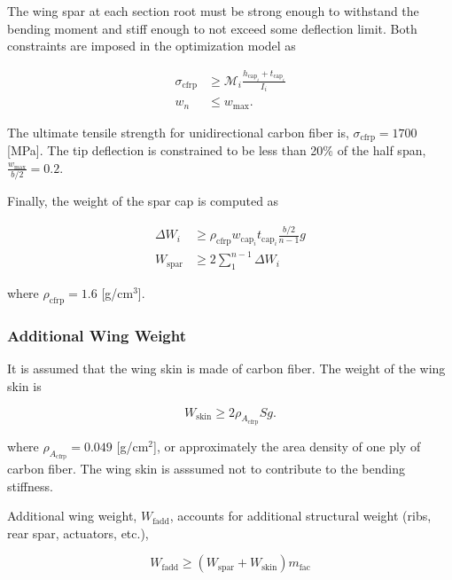 The wing spar at each section root must be strong enough to withstand the bending moment and stiff enough to not exceed some deflection limit.  Both constraints are imposed in the optimization model as

\begin{align}
    \label{e:stresscont}
    \sigma_{\text{cfrp}} &\geq \mathcal{M}_i \frac{h_{\text{cap}_i}+t_{\text{cap}_i}}{I_i}\\
    \label{e:defcont}
    w_n &\leq w_{\text{max}}.
\end{align}

The ultimate tensile strength for unidirectional carbon fiber is, $\sigma_{\text{cfrp}} = 1700$ [MPa].\cite{cfprop}
The tip deflection is constrained to be less than 20\% of the half span, $\frac{w_{\text{max}}}{b/2} = 0.2$.

Finally, the weight of the spar cap is computed as

\begin{align}
    \label{e:sparmass}
    \Delta W_i &\geq \rho_{\text{cfrp}} w_{\text{cap}_i}t_{\text{cap}_i} \frac{b/2}{n-1}g \\
    \label{e:sparmasssum}
    W_{\text{spar}} &\geq 2 \sum\limits_{1}^{n-1} \Delta W_i
\end{align}

where $\rho_{\text{cfrp}} = 1.6$ [g/cm$^3$].\cite{cfply}


\subsubsection{Additional Wing Weight}

It is assumed that the wing skin is made of carbon fiber.  The weight of the wing skin is 

\begin{equation}
    \label{e:wingskinweight}
    W_{\text{skin}} \geq 2 \rho_{A_{\text{cfrp}}} S g.
\end{equation}

where $\rho_{A_{\text{cfrp}}} = 0.049$ [g/cm$^2$], or approximately the area density of one ply of carbon fiber.\cite{cfply} The wing skin is asssumed not to contribute to the bending stiffness. 

Additional wing weight, $W_{\text{fadd}}$, accounts for additional structural weight (ribs, rear spar, actuators, etc.),

\begin{equation}
    W_{\text{fadd}} \geq (W_{\text{spar}} + W_{\text{skin}}) m_{\text{fac}}
\end{equation}


